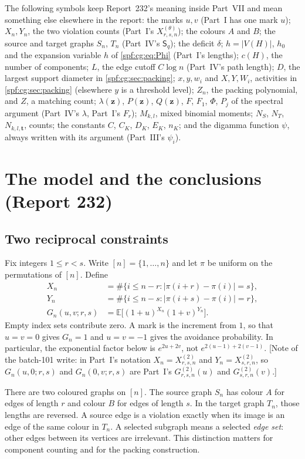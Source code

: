 \documentclass[11pt]{article}
\numberwithin{equation}{section}
\theoremstyle{definition}
\theoremstyle{remark}
\theoremstyle{definition}
\newcommand{\E}{\mathbb E}
\begin{document}
The following symbols keep Report~232's meaning inside Part~VII and mean
something else elsewhere in the report: the marks $u,v$ (Part~I has one mark
$u$); $X_n,Y_n$, the two violation counts (Part~I's $X^{(\theta)}_{r,s,n}$);
the colours $A$ and $B$; the source and target graphs $S_n$, $T_n$ (Part~IV's
$\mathsf S_q$); the deficit $\delta$; $h=|V(H)|$, $h_0$ and the expansion
variable $h$ of \eqref{spf:cg:eq:Phi} (Part~I's lengths); $c(H)$, the number
of components; $L$, the edge cutoff $C\log n$ (Part~IV's path length);
$D$, the largest support diameter in \cref{spf:cg:sec:packing}; $x,y,w_i$
and $X,Y,W_i$, activities in \cref{spf:cg:sec:packing} (elsewhere $y$ is a
threshold level); $Z_n$, the packing polynomial, and $Z$, a matching count;
$\lambda(\boldsymbol z)$, $P(\boldsymbol z)$, $Q(\boldsymbol z)$, $F$, $F_1$,
$\Phi$, $P_j$ of the spectral argument (Part~IV's $\lambda$, Part~I's
$F_r$); $M_{k,l}$, mixed binomial moments; $N_S$, $N_T$, $N_{k,l,\boldsymbol
t}$, counts; the constants $C$, $C_K$, $D_K$, $E_K$, $n_K$; and the
digamma function $\psi$, always written with its argument (Part~III's
$\psi_i$).

\section{The model and the conclusions (Report 232)}
\label{spf:cg:sec:model}

\subsection{Two reciprocal constraints}
Fix integers $1\le r<s$. Write $[n]=\{1,\ldots,n\}$ and let $\pi$ be uniform
on the permutations of $[n]$. Define
\begin{align}
 X_n&=\#\{i\le n-r:|\pi(i+r)-\pi(i)|=s\},\\
 Y_n&=\#\{i\le n-s:|\pi(i+s)-\pi(i)|=r\},\label{spf:cg:eq:model}\\
 G_n(u,v;r,s)&=\E\bigl[(1+u)^{X_n}(1+v)^{Y_n}\bigr].\label{spf:cg:eq:pgf}
\end{align}
Empty index sets contribute zero. A mark is the increment from $1$, so that
$u=v=0$ gives $G_n=1$ and $u=v=-1$ gives the avoidance probability. In
particular, the exponential factor below is $e^{2u+2v}$, not
$e^{2(u-1)+2(v-1)}$. [Note of the batch-101 write: in Part~I's notation
$X_n=X^{(2)}_{r,s,n}$ and $Y_n=X^{(2)}_{s,r,n}$, so $G_n(u,0;r,s)$ and
$G_n(0,v;r,s)$ are Part~I's $G^{(2)}_{r,s,n}(u)$ and $G^{(2)}_{s,r,n}(v)$.]

There are two coloured graphs on $[n]$. The source graph $S_n$ has colour $A$
for edges of length $r$ and colour $B$ for edges of length $s$. In the target
graph $T_n$, those lengths are reversed. A source edge is a violation exactly
when its image is an edge of the same colour in $T_n$. A selected subgraph
means a selected \emph{edge set}: other edges between its vertices are
irrelevant. This distinction matters for component counting and for the
packing construction.
\end{document}
